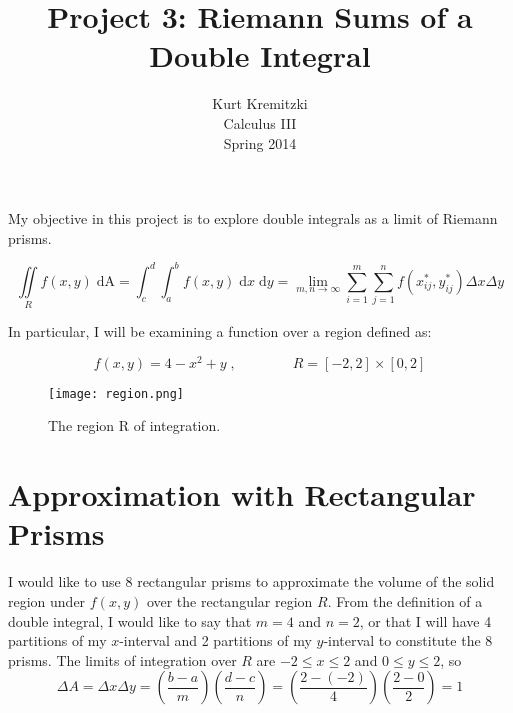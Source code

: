 \documentclass{article}
\begin{document}
\title{Project 3: Riemann Sums of a Double Integral}
\author{Kurt Kremitzki\\
        Calculus III\\
        Spring 2014}
\maketitle

My objective in this project is to explore double integrals as a limit of Riemann prisms.

\begin{equation}
    \iint\limits_R f(x,y) \; \mathrm{dA} = \int_c^d \int_a^b f(x,y) \;\mathrm{d}x\;\mathrm{d}y = \lim_{m,n \to \infty} \sum_{i=1}^{m} \sum_{j=1}^{n} f(x_{ij}^{ *}, y_{ij}^{ *}) \Delta x \Delta y
\end{equation}

In particular, I will be examining a function over a region defined as:

\begin{equation}
    f(x,y) = 4 - x^2 + y \;,
    \quad\quad\quad\quad R = [-2,2] \times [0,2]
\end{equation}
\begin{figure}
    \centering
    \texttt{[image: region.png]}
    \caption{The region R of integration.}
\end{figure}


\section{Approximation with Rectangular Prisms}


   I would like to use 8 rectangular prisms to approximate the volume of the solid region under
$f(x,y)$ over the rectangular region $R$. From the definition of a double integral, I would like to say that
$m = 4$ and $n = 2$, or that I will have 4 partitions of my $x$-interval and 2 partitions of my $y$-interval to
constitute the 8 prisms. The limits of integration over $R$ are $-2 \leq x \leq 2$ and $0 \leq y \leq 2$, so
\\
\begin{equation}
    \Delta A = \Delta x \Delta y = (\frac{b - a}{m})(\frac{d - c}{n}) = (\frac{2 - (-2)}{4})(\frac{2 - 0}{2}) = 1
\end{equation}
\end{document}
